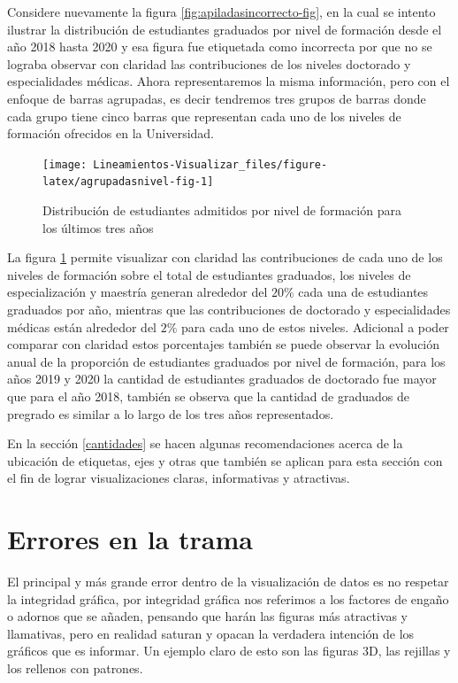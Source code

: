 \documentclass[
]{book}
\begin{document}
Considere nuevamente la figura \ref{fig:apiladasincorrecto-fig}, en la cual se intento ilustrar la distribución de estudiantes graduados por nivel de formación desde el año 2018 hasta 2020 y esa figura fue etiquetada como incorrecta por que no se lograba observar con claridad las contribuciones de los niveles doctorado y especialidades médicas. Ahora representaremos la misma información, pero con el enfoque de barras agrupadas, es decir tendremos tres grupos de barras donde cada grupo tiene cinco barras que representan cada uno de los niveles de formación ofrecidos en la Universidad.

\begin{figure}

{\centering \texttt{[image: Lineamientos-Visualizar\_files/figure-latex/agrupadasnivel-fig-1]} 

}

\caption{Distribución de estudiantes admitidos por nivel de formación para los últimos tres años}\label{fig:agrupadasnivel-fig}
\end{figure}

La figura \ref{fig:agrupadasnivel-fig} permite visualizar con claridad las contribuciones de cada uno de los niveles de formación sobre el total de estudiantes graduados, los niveles de especialización y maestría generan alrededor del \(20\%\) cada una de estudiantes graduados por año, mientras que las contribuciones de doctorado y especialidades médicas están alrededor del \(2\%\) para cada uno de estos niveles. Adicional a poder comparar con claridad estos porcentajes también se puede observar la evolución anual de la proporción de estudiantes graduados por nivel de formación, para los años 2019 y 2020 la cantidad de estudiantes graduados de doctorado fue mayor que para el año 2018, también se observa que la cantidad de graduados de pregrado es similar a lo largo de los tres años representados.

En la sección \ref{cantidades} se hacen algunas recomendaciones acerca de la ubicación de etiquetas, ejes y otras que también se aplican para esta sección con el fin de lograr visualizaciones claras, informativas y atractivas.

\hypertarget{errores-en-la-trama}{%
\chapter{Errores en la trama}\label{errores-en-la-trama}}

El principal y más grande error dentro de la visualización de datos es no respetar la integridad gráfica, por integridad gráfica nos referimos a los factores de engaño o adornos que se añaden, pensando que harán las figuras más atractivas y llamativas, pero en realidad saturan y opacan la verdadera intención de los gráficos que es informar. Un ejemplo claro de esto son las figuras 3D, las rejillas y los rellenos con patrones.
\end{document}
